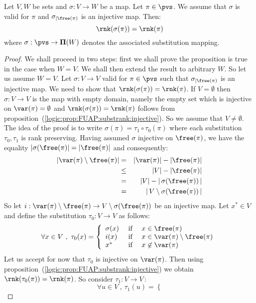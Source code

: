 \begin{prop}\label{logic:prop:FUAP:substrank:invariant:rank}
Let $V,W$ be sets and $\sigma:V\to W$ be a map. Let $\pi\in\pvs$. We
assume that $\sigma$ is valid for $\pi$ and $\sigma_{|\free(\pi)}$
is an injective map. Then:
    \[
    \rnk(\sigma(\pi))=\rnk(\pi)
    \]
where $\sigma:\pvs\to{\bf\Pi}(W)$ denotes the associated
substitution mapping.
\end{prop}
\begin{proof}
We shall proceed in two steps: first we shall prove the proposition
is true in the case when $W=V$. We shall then extend the result to
arbitrary $W$. So let us assume $W=V$. Let $\sigma:V\to V$ valid for
$\pi\in\pvs$ such that $\sigma_{|\free(\pi)}$ is an injective map.
We need to show that $\rnk(\sigma(\pi))=\rnk(\pi)$. If $V=\emptyset$
then $\sigma:V\to V$ is the map with empty domain, namely the empty
set which is injective on $\var(\pi)=\emptyset$ and
$\rnk(\sigma(\pi))=\rnk(\pi)$ follows from
proposition~(\ref{logic:prop:FUAP:substrank:injective}). So we
assume that $V\neq\emptyset$. The idea of the proof is to write
$\sigma(\pi)=\tau_{1}\circ\tau_{0}(\pi)$ where each substitution
$\tau_{0}, \tau_{1}$ is rank preserving. Having assumed $\sigma$
injective on $\free(\pi)$, we have the equality
$|\sigma(\free(\pi)|=|\free(\pi)|$ and consequently:
    \begin{eqnarray*}
    |\var(\pi)\setminus\free(\pi)|&=&|\var(\pi)|-|\free(\pi)|\\
    &\leq&|V|-|\free(\pi)|\\
    &=&|V|-|\,\sigma(\free(\pi))\,|\\
    &=&|\,V\setminus\sigma(\free(\pi))\,|
    \end{eqnarray*}
So let $i:\var(\pi)\setminus\free(\pi)\to
V\setminus\sigma(\free(\pi))$ be an injective map. Let $x^{*}\in V$
and define the substitution $\tau_{0}:V\to V$ as follows:
    \[
    \forall x\in V\ ,\ \tau_{0}(x)=\left\{
        \begin{array}{lcl}
        \sigma(x)&\mbox{\ if\ }&x\in\free(\pi)\\
        i(x)&\mbox{\ if\ }&x\in\var(\pi)\setminus\free(\pi)\\
        x^{*}&\mbox{\ if\ }&x\not\in\var(\pi)
        \end{array}
    \right.
    \]
Let us accept for now that $\tau_{0}$ is injective on $\var(\pi)$.
Then using proposition~(\ref{logic:prop:FUAP:substrank:injective})
we obtain $\rnk(\tau_{0}(\pi))=\rnk(\pi)$. So consider
$\tau_{1}:V\to V$\,:
    \[
    \forall u\in V\ ,\ \tau_{1}(u)=\left\{
\]
\end{proof}
